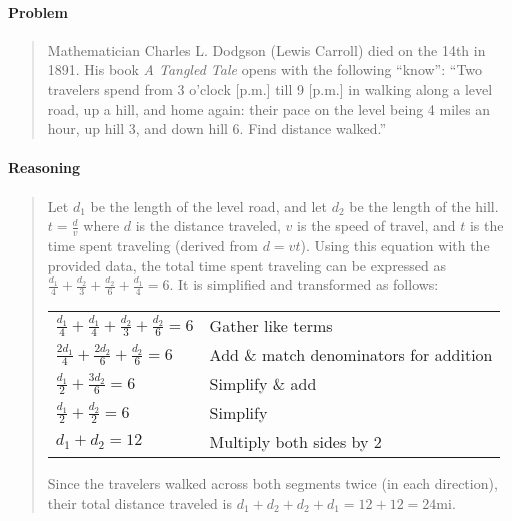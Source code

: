 \documentclass[letterpaper,12pt,twoside]{report}
\begin{document}
	\pagestyle{fancy}
	\fancyhf{}
	
	\paragraph{Problem}
	\begin{quote}
		\textsf{Mathematician Charles L. Dodgson (Lewis Carroll) died on the 14th in 1891. His book \textit{A Tangled Tale} opens with the following ``know'': ``Two travelers spend
			from 3 o'clock [p.m.] till 9 [p.m.] in
			walking along a level road, up a hill, and
			home again: their pace on the level being
			4 miles an hour, up hill 3, and down hill 6.
			Find distance walked.''}
	\end{quote}
	
	\begin{center}
	\end{center}
	
	\paragraph{Reasoning}
	\begin{quotation}
		
		Let $d_1$ be the length of the level road, and let $d_2$ be the length of the hill. $t=\frac{d}{v}$ where $d$ is the distance traveled, $v$ is the speed of travel, and $t$ is the time spent traveling (derived from $d=vt$). Using this equation with the provided data, the total time spent traveling can be expressed as $\frac{d_1}{4}+\frac{d_2}{3}+\frac{d_2}{6}+\frac{d_1}{4}=6$. It is simplified and transformed as follows:
		
		\begin{center}
			\begin{tabular}{l | l}
				$\frac{d_1}{4}+\frac{d_1}{4}+\frac{d_2}{3}+\frac{d_2}{6}=6$ & Gather like terms \\
				$\frac{2d_1}{4}+\frac{2d_2}{6}+\frac{d_2}{6}=6$ & Add \& match denominators for addition \\
				$\frac{d_1}{2}+\frac{3d_2}{6}=6$ & Simplify \& add \\
				$\frac{d_1}{2}+\frac{d_2}{2}=6$ & Simplify \\
				$d_1+d_2=12$ & Multiply both sides by 2
			\end{tabular}
		\end{center}
	
	Since the travelers walked across both segments twice (in each direction), their total distance traveled is $d_1+d_2+d_2+d_1=12+12=\boxed{24 \text{mi}}$.
	\end{quotation}
	
\end{document}
